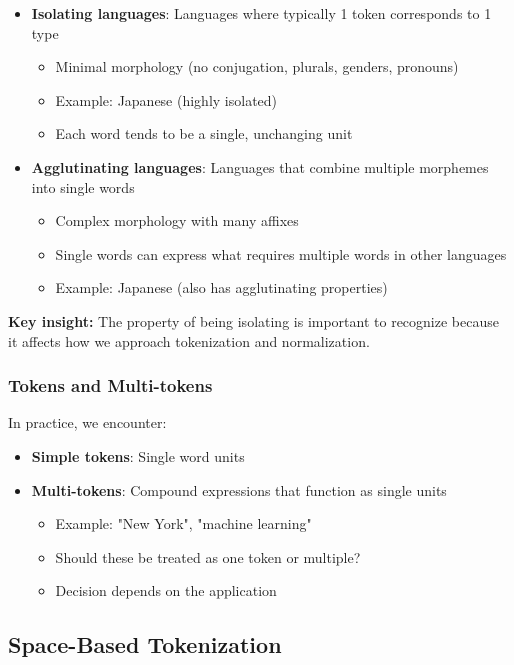 \documentclass[11pt,a4paper]{article}
\theoremstyle{definition}
\theoremstyle{plain}
\theoremstyle{remark}
\begin{document}
\begin{itemize}
    \item \textbf{Isolating languages}: Languages where typically 1 token corresponds to 1 type
    \begin{itemize}
        \item Minimal morphology (no conjugation, plurals, genders, pronouns)
        \item Example: Japanese (highly isolated)
        \item Each word tends to be a single, unchanging unit
    \end{itemize}
    
    \item \textbf{Agglutinating languages}: Languages that combine multiple morphemes into single words
    \begin{itemize}
        \item Complex morphology with many affixes
        \item Single words can express what requires multiple words in other languages
        \item Example: Japanese (also has agglutinating properties)
    \end{itemize}
\end{itemize}

\textbf{Key insight:} The property of being isolating is important to recognize because it affects how we approach tokenization and normalization.

\subsubsection{Tokens and Multi-tokens}

In practice, we encounter:
\begin{itemize}
    \item \textbf{Simple tokens}: Single word units
    \item \textbf{Multi-tokens}: Compound expressions that function as single units
    \begin{itemize}
        \item Example: "New York", "machine learning"
        \item Should these be treated as one token or multiple?
        \item Decision depends on the application
    \end{itemize}
\end{itemize}

\subsection{Space-Based Tokenization}
\end{document}
